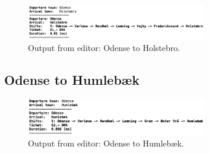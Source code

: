 \begin{figure}[th!]
\centering
\includegraphics[width=0.7\textwidth]{./graphics/ex2}
\caption{Output from editor: Odense to Holstebro.}
\label{fig:odense_holstebro}
\end{figure}

\subsection{Odense to Humlebæk}

\begin{figure}[th!]
\centering
\includegraphics[width=0.7\textwidth]{./graphics/ex3}
\caption{Output from editor: Odense to Humlebæk.}
\label{fig:odense_humlebæk}
\end{figure}






